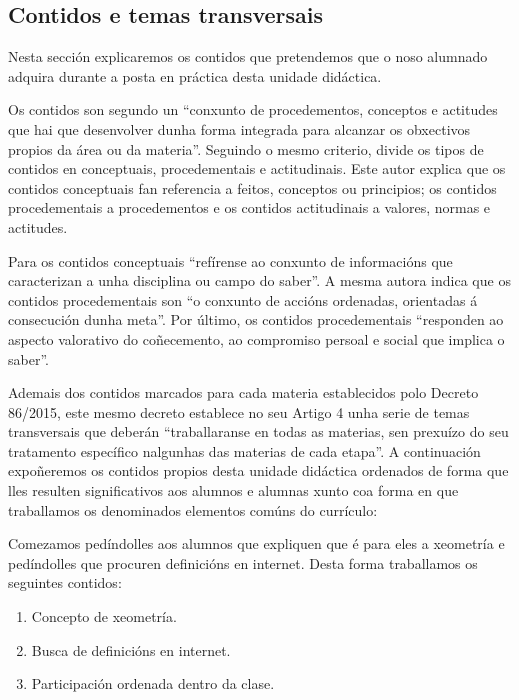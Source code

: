 \subsection{Contidos e temas transversais}\label{sec:contidos}

Nesta sección explicaremos os contidos que pretendemos que o noso alumnado adquira durante a posta en práctica desta unidade didáctica.

Os contidos son segundo  un ``conxunto de procedementos, conceptos e actitudes que hai que desenvolver dunha forma integrada para alcanzar os obxectivos propios da área ou da materia''. Seguindo o mesmo criterio,  divide os tipos de contidos en conceptuais, procedementais e actitudinais. Este autor explica que os contidos conceptuais fan referencia a feitos, conceptos ou principios; os contidos procedementais a procedementos e os contidos actitudinais a valores, normas e actitudes.

Para  os contidos conceptuais ``refírense ao conxunto de informacións que caracterizan a unha disciplina ou campo do saber''. A mesma autora indica que os contidos procedementais son ``o conxunto de accións ordenadas, orientadas á consecución dunha meta''. Por último, os contidos procedementais ``responden ao aspecto valorativo do coñecemento, ao compromiso persoal e social que implica o saber''.

Ademais dos contidos marcados para cada materia establecidos polo Decreto 86/2015, este mesmo decreto establece no seu Artigo 4 unha serie de temas transversais que deberán ``traballaranse en todas as materias, sen prexuízo do seu tratamento específico nalgunhas das materias de cada etapa''. A continuación expoñeremos os contidos propios desta unidade didáctica ordenados de forma que lles resulten significativos aos alumnos e alumnas xunto coa forma en que traballamos os denominados elementos comúns do currículo:

Comezamos pedíndolles aos alumnos que expliquen que é para eles a xeometría e pedíndolles que procuren definicións en internet. Desta forma traballamos os seguintes contidos:

\begin{enumerate}[label=\bfseries Con\arabic*, align=left, leftmargin=1.5cm]
    \item\label{con:xeometria} Concepto de xeometría.
    \item\label{con:buscadefinicions} Busca de definicións en internet.
    \item\label{con:participacionclase} Participación ordenada dentro da clase.
\end{enumerate}

